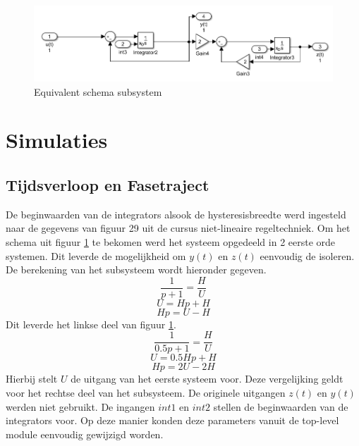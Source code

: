 \documentclass[12pt]{article}
\begin{document}
\begin{figure}[!h]
	\includegraphics[width=\textwidth ,keepaspectratio]{schemasubsystem2.png}
	\centering
	\caption{Equivalent schema subsystem}
	\label{schema2sub}
\end{figure} 
\section{Simulaties}
\subsection{Tijdsverloop en Fasetraject}
De beginwaarden van de integrators alsook de hysteresisbreedte werd ingesteld naar de gegevens van figuur 29 uit de cursus niet-lineaire regeltechniek. Om het schema uit figuur \ref{schema2sub} te bekomen werd het systeem opgedeeld in 2 eerste orde systemen. Dit leverde de mogelijkheid om $y(t)$ en $z(t)$ eenvoudig de isoleren. De berekening van het subsysteem wordt hieronder gegeven.
\begin{equation}
	\frac{1}{p+1} = \frac{H}{U}
\end{equation}
\begin{equation}
	U = Hp + H
\end{equation}
\begin{equation}
	Hp = U - H
\end{equation}
Dit leverde het linkse deel van figuur \ref{schema2sub}.
\begin{equation}
	\frac{1}{0.5p+1} = \frac{H}{U}
\end{equation}
\begin{equation}
	U = 0.5Hp + H
\end{equation}
\begin{equation}
	Hp = 2U - 2H
\end{equation}
Hierbij stelt $U$ de uitgang van het eerste systeem voor. Deze vergelijking geldt voor het rechtse deel van het subsysteem. De originele uitgangen $z(t)$ en $y(t)$ werden niet gebruikt. De ingangen $int1$ en $int2$ stellen de beginwaarden van de integrators voor. Op deze manier konden deze parameters vanuit de top-level module eenvoudig gewijzigd worden. \\ \\
\end{document}
